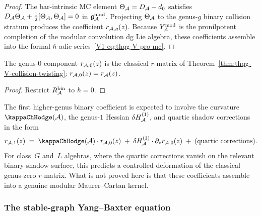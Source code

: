 \begin{proof}
The bar-intrinsic MC element $\Theta_{\mathcal{A}} = D_{\mathcal{A}} - d_0$
satisfies $D_{\mathcal{A}}\Theta_{\mathcal{A}} + \tfrac{1}{2}[\Theta_{\mathcal{A}},\Theta_{\mathcal{A}}] = 0$
in $\mathfrak{g}_{\mathcal{A}}^{\mathrm{mod}}$. Projecting $\Theta_{\mathcal{A}}$ to the genus-$g$ binary
collision stratum produces the coefficient $r_{\mathcal{A},g}(z)$.
Because $Y^{\mathrm{mod}}_{\mathcal{A}}$ is the pronilpotent completion of the modular
convolution dg Lie algebra, these coefficients assemble into the
formal $\hbar$-adic series~\eqref{V1-eq:thqg-V-pro-mc}.
\end{proof}

\begin{corollary}[Genus-$0$ component = classical $r$-matrix;
\ClaimStatusProvedHere]
The genus-$0$ component $r_{\mathcal{A},0}(z)$ is the classical $r$-matrix
of Theorem~\ref{thm:thqg-V-collision-twisting}:
$r_{\mathcal{A},0}(z) = r_{\mathcal{A}}(z)$.
\end{corollary}

\begin{proof}
Restrict $R^{\mathrm{bin}}_{\mathcal{A}}$ to $\hbar = 0$.
\end{proof}

\begin{remark}
The first higher-genus binary coefficient is expected to involve the
curvature $\kappaChHodge(\cA)$, the genus-$1$ Hessian
$\delta H^{(1)}_{\mathcal{A}}$, and quartic shadow corrections in the form
\begin{equation}%
r_{\cA,1}(z)
\;=\;
\kappaChHodge(\cA) \cdot r_{\cA,0}(z)
\;+\;
\delta H^{(1)}_\cA \cdot \partial_z r_{\cA,0}(z)
\;+\;
(\text{quartic corrections}).
\end{equation}
For class~$G$ and~$L$ algebras, where the quartic corrections vanish
on the relevant binary-shadow surface, this predicts a controlled
deformation of the classical genus-zero $r$-matrix. What is not
proved here is that these coefficients assemble into a genuine
modular Maurer--Cartan kernel.
\end{remark}


\subsubsection{The stable-graph Yang--Baxter equation}

